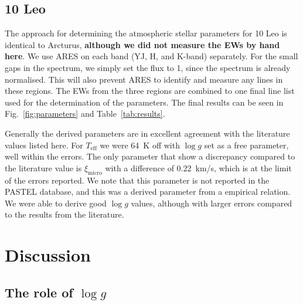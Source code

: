 \documentclass{aa}
\begin{document}
\subsection{10 Leo}
\label{sec:10Leo}

The approach for determining the atmospheric stellar parameters for 10 Leo is identical to Arcturus,
{\bf although we did not measure the EWs by hand here}. We use ARES on each band (YJ, H, and K-band)
separately. For the small gaps in the spectrum, we simply set the flux to 1, since the spectrum is
already normalised. This will also prevent ARES to identify and measure any lines in these regions.
The EWs from the three regions are combined to one final line list used for the determination of the
parameters. The final results can be seen in Fig.~\ref{fig:parameters} and Table~\ref{tab:results}.

Generally the derived parameters are in excellent agreement with the literature
values listed here.  For $T_\mathrm{eff}$ we were \SI{64}{K} off with $\log
g$ set as a free parameter, well within the errors. The only parameter that show
a discrepancy compared to the literature value is $\xi_\mathrm{micro}$ with a
difference of \SI{0.22}{km/s}, which is at the limit of the errors reported. We
note that this parameter is not reported in the PASTEL database, and this was a
derived parameter from a empirical relation. We were able to derive good $\log
g$ values, although with larger errors compared to the results from the
literature.



\section{Discussion}
\label{sec:discussion}

\subsection{The role of $\log g$}
\end{document}
